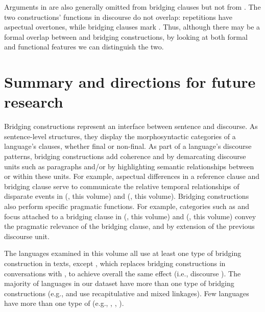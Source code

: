 \documentclass[output=paper]{LSP/langsci}
\begin{document}
Arguments in  are also generally omitted from bridging clauses but not from . The two constructions’ functions in discourse do not overlap: repetitions have aspectual overtones, while bridging clauses mark  \citep[][513--522]{kasia17}. Thus, although there may be a formal overlap between  and bridging constructions, by looking at both formal and functional features we can distinguish the two.

\section{Summary and directions for future research}
\label{GuAi6summary}\label{sec:guerin:6}
Bridging constructions represent an interface between sentence and discourse. As sentence-level structures, they display the morphosyntactic categories of a language's clauses, whether final or non-final. As part of a language’s discourse patterns, bridging constructions add coherence and  by demarcating discourse units such as paragraphs and/or by highlighting semantic relationships between or within these units. For example, aspectual differences in a reference clause and bridging clause serve to communicate the relative temporal relationships of disparate events in  (\citeauthor{aiton18}, this volume) and  (\citeauthor{jarkey18}, this volume). Bridging constructions also perform specific pragmatic functions. For example, categories such as  and focus attached to a bridging clause in  (\citeauthor{aiton18}, this volume) and  (\citeauthor{devries18}, this volume) convey the pragmatic relevance of the bridging clause, and by extension of the previous discourse unit. 

The languages examined in this volume all use at least one type of bridging construction in texts, except , which replaces bridging constructions in conversations with , to achieve overall the same effect (i.e., discourse ). The majority of languages in our dataset have more than one type of bridging constructions (e.g.,  and  use recapitulative and mixed linkages). Few languages have more than one type of  (e.g., , , ).
\end{document}
